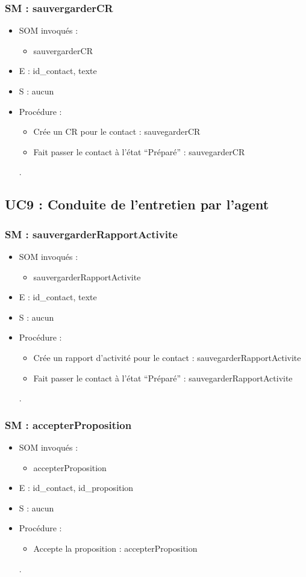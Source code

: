 \subsubsection{SM : sauvergarderCR}
\begin{itemize}
\item SOM invoqués :
\begin{itemize}
\item sauvergarderCR
\end{itemize}
\item E : id\_contact, texte
\item S : aucun
\item Procédure :
\begin{itemize}
\item Crée un CR pour le contact : sauvegarderCR
\item Fait passer le contact à l’état “Préparé” : sauvegarderCR
\end{itemize}.
\end{itemize}
\subsection{UC9 : Conduite de l’entretien par l’agent}
\subsubsection{SM : sauvergarderRapportActivite}
\begin{itemize}
\item SOM invoqués :
\begin{itemize}
\item sauvergarderRapportActivite
\end{itemize}
\item E : id\_contact, texte
\item S : aucun
\item Procédure :
\begin{itemize}
\item Crée un rapport d’activité pour le contact :
sauvegarderRapportActivite
\item Fait passer le contact à l’état “Préparé” : sauvegarderRapportActivite
\end{itemize}.
\end{itemize}
\subsubsection{SM : accepterProposition}
\begin{itemize}
\item SOM invoqués :
\begin{itemize}
\item accepterProposition
\end{itemize}
\item E : id\_contact, id\_proposition
\item S : aucun
\item Procédure :
\begin{itemize}
\item Accepte la proposition : accepterProposition
\end{itemize}.
\end{itemize}
